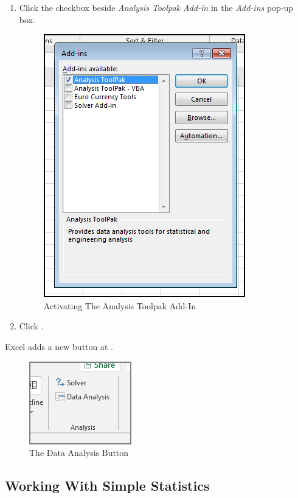 \begin{enumbox}
\begin{enumerate}
		\item Click the checkbox beside \textit{Analysis Toolpak Add-in} in the \textit{Add-ins} pop-up box. 
	
		\begin{figure}[H]
			\centering
			\includegraphics[width=\maxwidth{.75\linewidth}]{gfx/ch09_fig52}
			\caption{Activating The Analysis Toolpak Add-In}
			\label{09:fig52}
		\end{figure}

		\item Click .
	\end{enumerate}
\end{enumbox}

Excel adds a new button at .

\begin{figure}[H]
	\centering
	\includegraphics[width=\maxwidth{.35\linewidth}]{gfx/ch09_fig53}
	\caption{The Data Analysis Button}
	\label{09:fig53}
\end{figure}

\subsection{Working With Simple Statistics}


